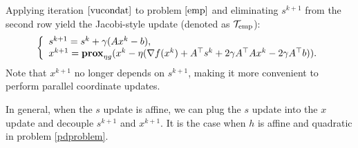 {{%
Applying iteration $\eqref{vucondat}$ to problem $\eqref{emp}$ and eliminating $s^{k+1}$ from the second row yield the Jacobi-style update (denoted as ${\mathcal{T}}_\textnormal{emp}$):
\begin{equation}
\left\{
\begin{array}{l}
s^{k+1}=s^k+\gamma (Ax^k-b),\\
x^{k+1}=\prox_{\eta g}(x^k-\eta(\nabla f(x^k)+A^\top s^k+2\gamma A^\top Ax^k-2\gamma A^\top b)).
\end{array}
\right.\label{pdemp}
\end{equation}
Note that $x^{k+1}$ no longer depends on $s^{k+1}$, making it more convenient to perform parallel coordinate updates. 
%
\begin{remark}
In general, when the $s$ update is affine, we can plug the $s$ update into the $x$ update and decouple $s^{k+1}$ and $x^{k+1}$. It is the case when $h$ is affine and quadratic in problem \eqref{pdproblem}.
\end{remark}
}}
